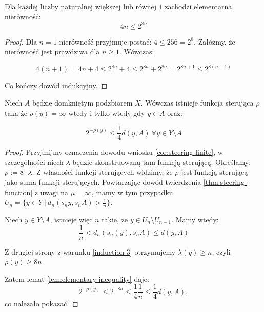 \begin{lem} \label{lem:elementary-inequality}
  Dla każdej liczby naturalnej większej lub równej $1$ zachodzi elementarna nierówność:
  \[4n \leq 2^{8n}\]
  
  \begin{proof}
    Dla $n = 1$ nierówność przyjmuje postać: $4 \leq 256 = 2^8$.
    Załóżmy, że nierówność jest prawdziwa dla $n \geq 1$. Wówczas:
    
    \[4(n+1) = 4n + 4 \leq 2^{8n} + 4 \leq 2^{8n} + 2^{8n} = 2^{8n + 1} \leq 2^{8(n+1)}\]
    
    Co kończy dowód indukcyjny.
  \end{proof}
\end{lem}

\begin{cor} \label{cor:steering-dist}
  Niech $A$ będzie domkniętym podzbiorem $X$. Wówczas istnieje funkcja sterująca $\rho$ taka że $\rho(y) = \infty$ wtedy i tylko wtedy gdy $y \in A$ oraz:
  
  \[2^{-\rho(y)} \leq \frac{1}{4}d(y,A)\ \forall y \in Y \setminus A\]
  
  \begin{proof}
    Przyjmijmy oznaczenia dowodu wniosku \ref{cor:steering-finite}, w szczególności niech $\lambda$ będzie skonstruowaną tam funkcją sterującą. Określamy: $\rho := 8 \cdot \lambda$. Z własności funkcji sterujących widzimy, że $\rho$ jest funkcją sterującą jako suma funkcji sterujących.
    Powtarzając dowód twierdzenia \ref{thm:steering-function} z uwagi na $\mu = \infty$, mamy w tym przypadku $U_n = \{y \in Y\ |\ d_n(s_n y, s_n A) > \frac{1}{n}\}$.
    
    Niech $y \in Y \setminus A$, istnieje więc $n$ takie, że $y \in U_n\setminus U_{n-1}$. Mamy wtedy:
    \[
      \frac{1}{n} < d_{n}(s_{n}(y), s_{n} A)  \leq d(y, A)
    \]
    
    Z drugiej strony z warunku \ref{induction-3} otrzymujemy $\lambda(y) \geq n$, czyli $\rho(y) \geq 8n$.
    
    Zatem lemat \ref{lem:elementary-inequality} daje:
    \[
      2^{-\rho(y)} \leq 2^{-8n} \leq \frac{1}{4}\frac{1}{n} \leq \frac{1}{4}d(y,A),
    \]
    co należało pokazać.
  \end{proof}
\end{cor}
